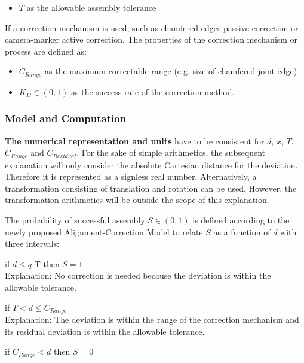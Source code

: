 \begin{itemize}
	\item $T$ as the allowable assembly tolerance
\end{itemize}

If a correction mechanism is used, such as chamfered edges passive correction or camera-marker active correction. The properties of the correction mechanism or process are defined as:

\begin{itemize}[nosep]
	\item $C_{Range}$ as the maximum correctable range (e.g. size of chamfered joint edge)

	\item  $K_D \in (0,1)$ as the success rate of the correction method.

\end{itemize}

\subsubsection{Model and Computation}
\label{subsubsection:model-and-computation}

\textbf{The numerical representation and units} have to be consistent for $d$, $x$, $T$, $C_{Range}$ and $C_{Residual}$. For the sake of simple arithmetics, the subsequent explanation will only consider the absolute Cartesian distance for the deviation. Therefore it is represented as a signless real number. Alternatively, a transformation consisting of translation and rotation can be used. However, the transformation arithmetics will be outside the scope of this explanation.

The probability of successful assembly $S \in (0, 1)$ is defined according to the newly proposed Alignment-Correction Model to relate $S$ as a function of $d$ with three intervals:

\begin{description}[] %
	\item [No correction needed] if $d \le q$ T then $S = 1$\\ Explanation: No correction is needed because the deviation is within the allowable tolerance.
	\item [Correction success] if $T < d \leq C_{Range}$ \\ Explanation: The deviation is within the range of the correction mechanism and its residual deviation is within the allowable tolerance.
	\item [Correction failure] if $C_{Range} < d$ then $S = 0$
\end{description}

